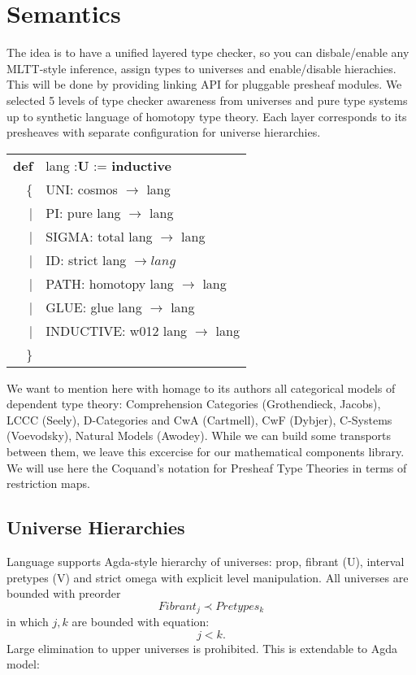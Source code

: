 \documentclass[a4paper,UKenglish,cleveref, autoref, thm-restate]{lipics-v2021}
\newcommand{\tabstyle}[0]{\scriptsize\ttfamily\fontseries{l}\selectfont}
\begin{document}
\newpage
\section{Semantics}
The idea is to have a unified layered type checker, so you can disbale/enable any MLTT-style inference,
assign types to universes and enable/disable hierachies. This will be done by providing linking API for
pluggable presheaf modules. We selected 5 levels of type checker awareness from universes and pure type
systems up to synthetic language of homotopy type theory. Each layer corresponds to its presheaves with
separate configuration for universe hierarchies.
\begin{table}[ht]
\tabstyle
\begin{tabular}{rl}
     \textbf{def} & lang :\textbf{U} := \textbf{inductive} \\
               \{ & UNI: cosmos $\rightarrow$ lang \\
               |  & PI: pure lang $\rightarrow$ lang \\
               |  & SIGMA: total lang $\rightarrow$ lang \\
               |  & ID: strict lang $\rightarrow lang$ \\
               |  & PATH: homotopy lang $\rightarrow$ lang \\
               |  & GLUE: glue lang $\rightarrow$ lang \\
               |  & INDUCTIVE: w012 lang $\rightarrow$ lang \\
               \} & \\
\end{tabular}
\end{table}
We want to mention here with homage to its authors all categorical models of dependent type theory:
Comprehension Categories (Grothendieck, Jacobs), LCCC (Seely), D-Categories and CwA (Cartmell),
CwF (Dybjer), C-Systems (Voevodsky), Natural Models (Awodey). While we can build some transports
between them, we leave this excercise for our mathematical components library.
We will use here the Coquand's notation for Presheaf Type Theories in terms of restriction maps.

\subsection{Universe Hierarchies}

Language supports Agda-style hierarchy of universes: prop, fibrant (U), interval pretypes (V) and
strict omega with explicit level manipulation. All universes are bounded with preorder
\begin{equation}
Fibrant_j \prec Pretypes_k
\end{equation}
in which $j,k$ are bounded with equation:
\begin{equation}
j < k.
\end{equation}
Large elimination to upper universes is prohibited. This is extendable to Agda model:
\end{document}

